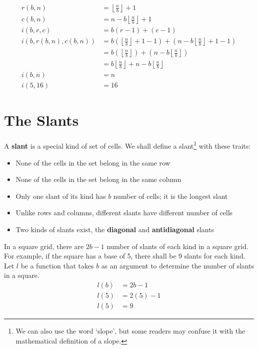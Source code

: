\documentclass[twoside,openany,12pt]{book}
\begin{document}
    \begin{equation}
      \begin{aligned}
        r(b,n) &= \left\lfloor \frac{n}{b} \right\rfloor + 1 \\
        c(b,n) &= n - b\left\lfloor \frac{n}{b} \right\rfloor + 1 \\
        i(b,r,c) &= b(r-1)+(c-1) \\
        i(b,r(b,n),c(b,n)) &= b(\left\lfloor \frac{n}{b} \right\rfloor + 1 -1)+(n - b\left\lfloor \frac{n}{b} \right\rfloor + 1 -1) \\
                &= b(\left\lfloor \frac{n}{b} \right\rfloor)+(n - b\left\lfloor \frac{n}{b} \right\rfloor) \\
                &= b\left\lfloor \frac{n}{b} \right\rfloor + n - b\left\lfloor \frac{n}{b} \right\rfloor \\
        i(b,n) &= n \\
        i(5,16) &= 16 
      \end{aligned} 
    \end{equation}
    \newpage

    \chapter{The Slants} \label{slants}
    A \textbf{slant} is a special kind of set of cells. We shall define a slant\footnote{We can also use the word `slope', but some readers may confuse it with the mathematical definition of a slope.} with these traits:
    \begin{itemize}
        \item None of the cells in the set belong in the same row
        \item None of the cells in the set belong in the same column
        \item Only one slant of its kind has $b$ number of cells; it is the longest slant
        \item Unlike rows and columns, different slants have different number of cells
        \item Two kinds of slants exist, the \textbf{diagonal} and \textbf{antidiagonal} slants
    \end{itemize}

    In a square grid, there are $2b-1$ number of slants of each kind in a square grid. For example, if the square has a base of 5, there shall be 9 slants for each kind. Let $l$ be a function that takes $b$ as an argument to determine the number of slants in a square.
    \begin{equation}
        \begin{split}
            l(b) &= 2b - 1 \\
            l(5) &= 2(5) - 1 \\
            l(5) &= 9
        \end{split}
    \end{equation}
\end{document}
